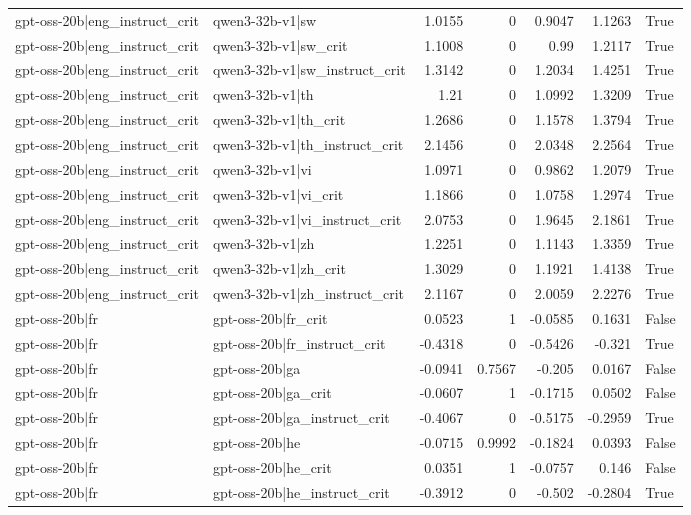 \begin{table}
\begin{tabular}{l l r r r r l}
gpt-oss-20b|eng_instruct_crit & qwen3-32b-v1|sw & 1.0155 & 0 & 0.9047 & 1.1263 & True \\
gpt-oss-20b|eng_instruct_crit & qwen3-32b-v1|sw_crit & 1.1008 & 0 & 0.99 & 1.2117 & True \\
gpt-oss-20b|eng_instruct_crit & qwen3-32b-v1|sw_instruct_crit & 1.3142 & 0 & 1.2034 & 1.4251 & True \\
gpt-oss-20b|eng_instruct_crit & qwen3-32b-v1|th & 1.21 & 0 & 1.0992 & 1.3209 & True \\
gpt-oss-20b|eng_instruct_crit & qwen3-32b-v1|th_crit & 1.2686 & 0 & 1.1578 & 1.3794 & True \\
gpt-oss-20b|eng_instruct_crit & qwen3-32b-v1|th_instruct_crit & 2.1456 & 0 & 2.0348 & 2.2564 & True \\
gpt-oss-20b|eng_instruct_crit & qwen3-32b-v1|vi & 1.0971 & 0 & 0.9862 & 1.2079 & True \\
gpt-oss-20b|eng_instruct_crit & qwen3-32b-v1|vi_crit & 1.1866 & 0 & 1.0758 & 1.2974 & True \\
gpt-oss-20b|eng_instruct_crit & qwen3-32b-v1|vi_instruct_crit & 2.0753 & 0 & 1.9645 & 2.1861 & True \\
gpt-oss-20b|eng_instruct_crit & qwen3-32b-v1|zh & 1.2251 & 0 & 1.1143 & 1.3359 & True \\
gpt-oss-20b|eng_instruct_crit & qwen3-32b-v1|zh_crit & 1.3029 & 0 & 1.1921 & 1.4138 & True \\
gpt-oss-20b|eng_instruct_crit & qwen3-32b-v1|zh_instruct_crit & 2.1167 & 0 & 2.0059 & 2.2276 & True \\
gpt-oss-20b|fr & gpt-oss-20b|fr_crit & 0.0523 & 1 & -0.0585 & 0.1631 & False \\
gpt-oss-20b|fr & gpt-oss-20b|fr_instruct_crit & -0.4318 & 0 & -0.5426 & -0.321 & True \\
gpt-oss-20b|fr & gpt-oss-20b|ga & -0.0941 & 0.7567 & -0.205 & 0.0167 & False \\
gpt-oss-20b|fr & gpt-oss-20b|ga_crit & -0.0607 & 1 & -0.1715 & 0.0502 & False \\
gpt-oss-20b|fr & gpt-oss-20b|ga_instruct_crit & -0.4067 & 0 & -0.5175 & -0.2959 & True \\
gpt-oss-20b|fr & gpt-oss-20b|he & -0.0715 & 0.9992 & -0.1824 & 0.0393 & False \\
gpt-oss-20b|fr & gpt-oss-20b|he_crit & 0.0351 & 1 & -0.0757 & 0.146 & False \\
gpt-oss-20b|fr & gpt-oss-20b|he_instruct_crit & -0.3912 & 0 & -0.502 & -0.2804 & True \\

\end{tabular}
\end{table}
